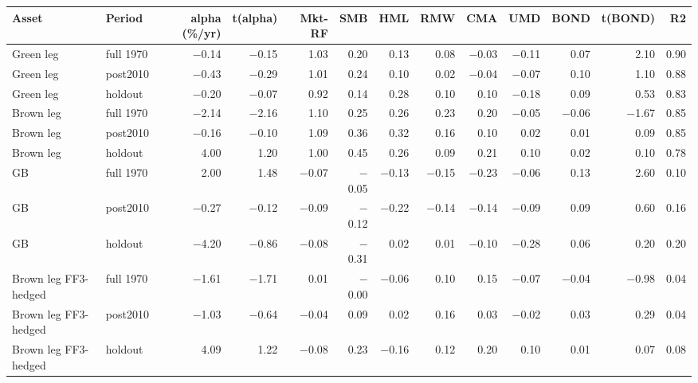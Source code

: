 \begin{tabular}{llrrrrrrrrrrr}
\toprule
Asset & Period & alpha (\%/yr) & t(alpha) & Mkt-RF & SMB & HML & RMW & CMA & UMD & BOND & t(BOND) & R2 \\
\midrule
Green leg & full 1970 & $-$0.14 & $-$0.15 & 1.03 & 0.20 & 0.13 & 0.08 & $-$0.03 & $-$0.11 & 0.07 & 2.10 & 0.90 \\
Green leg & post2010 & $-$0.43 & $-$0.29 & 1.01 & 0.24 & 0.10 & 0.02 & $-$0.04 & $-$0.07 & 0.10 & 1.10 & 0.88 \\
Green leg & holdout & $-$0.20 & $-$0.07 & 0.92 & 0.14 & 0.28 & 0.10 & 0.10 & $-$0.18 & 0.09 & 0.53 & 0.83 \\
Brown leg & full 1970 & $-$2.14 & $-$2.16 & 1.10 & 0.25 & 0.26 & 0.23 & 0.20 & $-$0.05 & $-$0.06 & $-$1.67 & 0.85 \\
Brown leg & post2010 & $-$0.16 & $-$0.10 & 1.09 & 0.36 & 0.32 & 0.16 & 0.10 & 0.02 & 0.01 & 0.09 & 0.85 \\
Brown leg & holdout & 4.00 & 1.20 & 1.00 & 0.45 & 0.26 & 0.09 & 0.21 & 0.10 & 0.02 & 0.10 & 0.78 \\
GB & full 1970 & 2.00 & 1.48 & $-$0.07 & $-$0.05 & $-$0.13 & $-$0.15 & $-$0.23 & $-$0.06 & 0.13 & 2.60 & 0.10 \\
GB & post2010 & $-$0.27 & $-$0.12 & $-$0.09 & $-$0.12 & $-$0.22 & $-$0.14 & $-$0.14 & $-$0.09 & 0.09 & 0.60 & 0.16 \\
GB & holdout & $-$4.20 & $-$0.86 & $-$0.08 & $-$0.31 & 0.02 & 0.01 & $-$0.10 & $-$0.28 & 0.06 & 0.20 & 0.20 \\
Brown leg FF3-hedged & full 1970 & $-$1.61 & $-$1.71 & 0.01 & $-$0.00 & $-$0.06 & 0.10 & 0.15 & $-$0.07 & $-$0.04 & $-$0.98 & 0.04 \\
Brown leg FF3-hedged & post2010 & $-$1.03 & $-$0.64 & $-$0.04 & 0.09 & 0.02 & 0.16 & 0.03 & $-$0.02 & 0.03 & 0.29 & 0.04 \\
Brown leg FF3-hedged & holdout & 4.09 & 1.22 & $-$0.08 & 0.23 & $-$0.16 & 0.12 & 0.20 & 0.10 & 0.01 & 0.07 & 0.08 \\
\bottomrule
\end{tabular}
